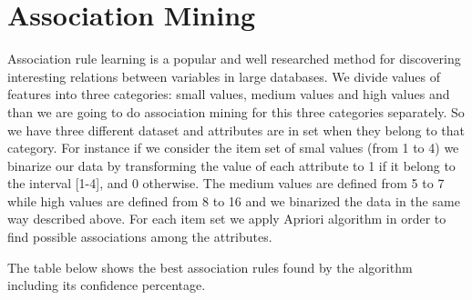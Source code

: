 \chapter*{Association Mining}
\setcounter{chapter}{2}
Association rule learning is a popular and well researched method for discovering interesting relations between variables in large databases. We divide values of features into three categories: small values, medium values and high values and than we are going to do association mining for this three categories separately. So we have three different dataset and attributes are in set when they belong to that category. For instance if we consider the item set of smal values (from 1 to 4)
  we binarize our data by transforming the value of each attribute to 1 if it belong to the interval [1-4], and 0 otherwise. The medium values are defined from 5 to 7 while   high values are defined from 8 to 16 and we binarized the data in the same way described above.
  For each item set we apply Apriori algorithm in order to find possible associations among the attributes.
  
  The table below shows the best association rules found by the algorithm including its confidence percentage.

